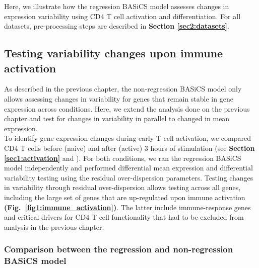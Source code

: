 Here, we illustrate how the regression BASiCS model assesses changes in expression variability using CD4\plus{} T cell activation and differentiation. For all datasets, pre-processing steps are described in \textbf{Section \ref{sec2:datasets}}. 

\subsection{Testing variability changes upon immune activation}
\label{sec2:immune_activation}

As described in the previous chapter, the non-regression BASiCS model only allows assessing changes in variability for genes that remain stable in gene expression across conditions. Here, we extend the analysis done on the previous chapter and test for changes in variability in parallel to changed in mean expression. \\

To identify gene expression changes during early T cell activation, we compared CD4\plus{} T cells before (naive) and after (active) 3 hours of stimulation (see \textbf{Section \ref{sec1:activation}} and \citep{Martinez-jimenez2017}). For both conditions, we ran the regression BASiCS model independently and performed differential mean expression and differential variability testing using the residual over-dispersion parameters. Testing changes in variability through residual over-dispersion allows testing across all genes, including the large set of genes that are up-regulated upon immune activation \textbf{(Fig.~\ref{fig1:immune_activation})}. The latter include immune-response genes and critical drivers for CD4\plus{} T cell functionality that had to be excluded from analysis in the previous chapter.

\subsubsection{Comparison between the regression and non-regression BASiCS model}

